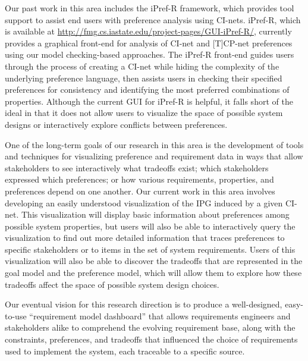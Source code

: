 Our past work in this area includes the iPref-R framework, which provides tool support to assist end users with preference analysis using CI-nets. iPref-R, which is available at \url{http://fmg.cs.iastate.edu/project-pages/GUI-iPref-R/}, currently provides a graphical front-end for analysis of CI-net and [T]CP-net preferences using our model checking-based approaches. The iPref-R front-end guides users through the process of creating a CI-net while hiding the complexity of the underlying preference language, then assists users in checking their specified preferences for consistency and identifying the most preferred combinations of properties. Although the current GUI for iPref-R is helpful, it falls short of the ideal in that it does not allow users to visualize the space of possible system designs or interactively explore conflicts between preferences.

One of the long-term goals of our research in this area is the development of tools and techniques for visualizing preference and requirement data in ways that allow stakeholders to see interactively what tradeoffs exist; which stakeholders expressed which preferences; or how various requirements, properties, and preferences depend on one another. Our current work in this area involves developing an easily understood visualization of the IPG induced by a given CI-net. This visualization will display basic information about preferences among possible system properties, but users will also be able to interactively query the visualization to find out more detailed information that traces preferences to specific stakeholders or to items in the set of system requirements. Users of this visualization will also be able to discover the tradeoffs that are represented in the goal model and the preference model, which will allow them to explore how these tradeoffs affect the space of possible system design choices.

Our eventual vision for this research direction is to produce a well-designed, easy-to-use ``requirement model dashboard'' that allows requirements engineers and stakeholders alike to comprehend the evolving requirement base, along with the constraints, preferences, and tradeoffs that influenced the choice of requirements used to implement the system, each traceable to a specific source.

